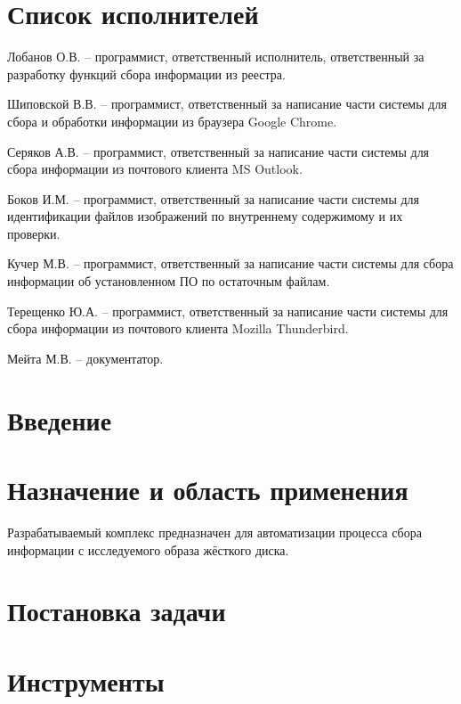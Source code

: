 


 
 
 
 \newpage
 \section*{Список исполнителей}
 
Лобанов О.В. -- программист, ответственный исполнитель, ответственный за разработку функций сбора информации из реестра. 

Шиповской В.В. -- программист, ответственный за написание части системы для сбора и обработки информации из браузера Google Chrome.

Серяков А.В. -- программист, ответственный за написание части системы для сбора информации из почтового клиента MS Outlook.

Боков И.М. -- программист, ответственный за написание части системы для идентификации файлов изображений по внутреннему содержимому и их проверки.

Кучер М.В. -- программист, ответственный за написание части системы для сбора информации об установленном ПО по остаточным файлам.

Терещенко Ю.А. -- программист, ответственный за написание части системы для сбора информации из почтового клиента Mozilla Thunderbird.

Мейта М.В. -- документатор.

 
 \newpage
 \tableofcontents

 \newpage
 \section*{Введение}
 

 \section{Назначение и область применения}
Разрабатываемый комплекс предназначен для автоматизации процесса сбора информации с исследуемого образа жёсткого диска.
\section{Постановка задачи}
\setcounter{figure}{0}

\section{Инструменты}
\setcounter{figure}{0}
